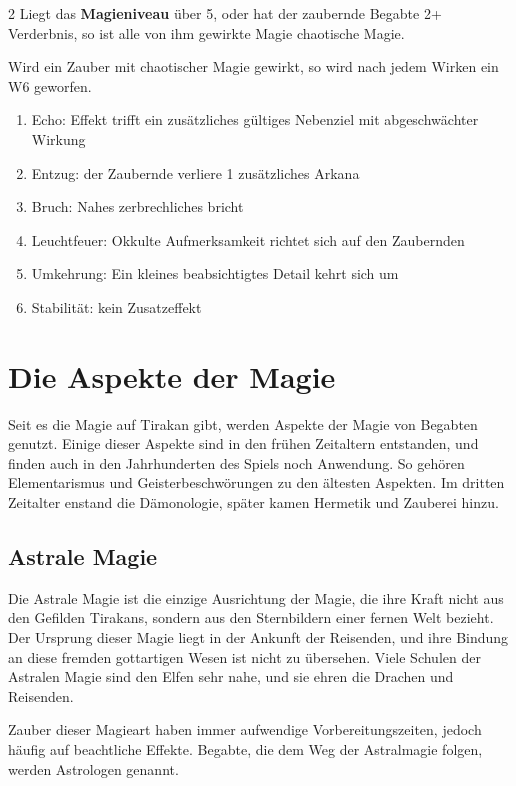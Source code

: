 \begin{multicols*}{2}
Liegt das \textbf{Magieniveau} über 5, oder hat der zaubernde Begabte 2+ Verderbnis, so ist alle von ihm gewirkte Magie chaotische Magie.

Wird ein Zauber mit chaotischer Magie gewirkt, so wird nach jedem Wirken ein W6 geworfen.

\begin{enumerate}[leftmargin=*]
\item Echo: Effekt trifft ein zusätzliches gültiges Nebenziel mit abgeschwächter Wirkung
\item Entzug: der Zaubernde verliere 1 zusätzliches Arkana
\item Bruch: Nahes zerbrechliches bricht
\item Leuchtfeuer: Okkulte Aufmerksamkeit richtet sich auf den Zaubernden
\item Umkehrung: Ein kleines beabsichtigtes Detail kehrt sich um
\item Stabilität: kein Zusatzeffekt
\end{enumerate}

\section{Die Aspekte der Magie}\label{sec:die-aspekte-der-magie}

Seit es die Magie auf Tirakan gibt, werden Aspekte der Magie von Begabten genutzt.
Einige dieser Aspekte sind in den frühen Zeitaltern entstanden, und finden auch in den Jahrhunderten des Spiels noch Anwendung.
So gehören Elementarismus und Geisterbeschwörungen zu den ältesten Aspekten.
Im dritten Zeitalter enstand die Dämonologie, später kamen Hermetik und Zauberei hinzu.

\subsection{Astrale Magie}\label{subsec:astrale-magie}

Die Astrale Magie ist die einzige Ausrichtung der Magie, die ihre Kraft nicht aus den Gefilden Tirakans, sondern aus den Sternbildern einer fernen Welt bezieht.
Der Ursprung dieser Magie liegt in der Ankunft der Reisenden, und ihre Bindung an diese fremden gottartigen Wesen ist nicht zu übersehen.
Viele Schulen der Astralen Magie sind den Elfen sehr nahe, und sie ehren die Drachen und Reisenden.

Zauber dieser Magieart haben immer aufwendige Vorbereitungszeiten, jedoch häufig auf beachtliche Effekte.
Begabte, die dem Weg der Astralmagie folgen, werden Astrologen genannt.


\end{multicols*}
